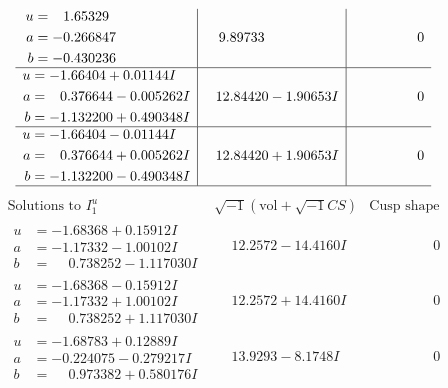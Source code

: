 \documentclass[1p]{elsarticle_modified}
\theoremstyle{definition}
\newcommand{\I}{\sqrt{-1}}
\begin{document}
$$\begin{array}{c|c|c}
\begin{aligned}
u &= \phantom{-}1.65329\phantom{ +0.000000I} \\
a &= -0.266847\phantom{ +0.000000I} \\
b &= -0.430236\phantom{ +0.000000I}\end{aligned}
 & \phantom{-}9.89733\phantom{ +0.000000I} & \phantom{-0.000000 } 0 \\ \hline\begin{aligned}
u &= -1.66404 + 0.01144 I \\
a &= \phantom{-}0.376644 - 0.005262 I \\
b &= -1.132200 + 0.490348 I\end{aligned}
 & \phantom{-}12.84420 - 1.90653 I & \phantom{-0.000000 } 0 \\ \hline\begin{aligned}
u &= -1.66404 - 0.01144 I \\
a &= \phantom{-}0.376644 + 0.005262 I \\
b &= -1.132200 - 0.490348 I\end{aligned}
 & \phantom{-}12.84420 + 1.90653 I & \phantom{-0.000000 } 0\\
 \hline 
 \end{array}$$\newpage$$\begin{array}{c|c|c}  
\text{Solutions to }I^u_{1}& \I (\text{vol} + \sqrt{-1}CS) & \text{Cusp shape}\\
 \hline 
\begin{aligned}
u &= -1.68368 + 0.15912 I \\
a &= -1.17332 - 1.00102 I \\
b &= \phantom{-}0.738252 - 1.117030 I\end{aligned}
 & \phantom{-}12.2572 - 14.4160 I & \phantom{-0.000000 } 0 \\ \hline\begin{aligned}
u &= -1.68368 - 0.15912 I \\
a &= -1.17332 + 1.00102 I \\
b &= \phantom{-}0.738252 + 1.117030 I\end{aligned}
 & \phantom{-}12.2572 + 14.4160 I & \phantom{-0.000000 } 0 \\ \hline\begin{aligned}
u &= -1.68783 + 0.12889 I \\
a &= -0.224075 - 0.279217 I \\
b &= \phantom{-}0.973382 + 0.580176 I\end{aligned}
 & \phantom{-}13.9293 - 8.1748 I & \phantom{-0.000000 } 0 \\ \hline\begin{aligned}

\end{aligned}
\end{array}$$
\end{document}

